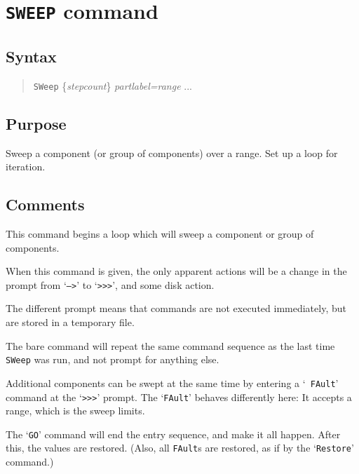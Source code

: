 \section{{\tt SWEEP} command}
\subsection{Syntax}
\begin{verse}
{\tt SWeep} \{{\it stepcount}\}  {\it partlabel=range} ...
\end{verse}
\subsection{Purpose}

Sweep a component (or group of components) over a range.  Set up a loop for
iteration.
\subsection{Comments}

This command begins a loop which will sweep a component or group of
components.

When this command is given, the only apparent actions will be a change in the
prompt from `{\tt -->}' to `{\tt >>>}', and some disk action.

The different prompt means that commands are not executed immediately, but
are stored in a temporary file.

The bare command will repeat the same command sequence as the last time {\tt
SWeep} was run, and not prompt for anything else.

Additional components can be swept at the same time by entering a `{\tt
FAult}' command at the `{\tt >>>}' prompt.  The `{\tt FAult}' behaves
differently here:  It accepts a range, which is the sweep limits.

The `{\tt GO}' command will end the entry sequence, and make it all happen.
After this, the values are restored.  (Also, all {\tt FAult}s are restored,
as if by the `{\tt Restore}' command.)

